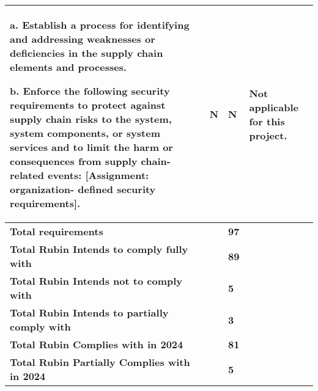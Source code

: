\begin{longtable} {|p{}|p{}|p{}|p{} |}
{a. Establish a process for identifying and addressing weaknesses or deficiencies in the supply chain elements and processes.

b. Enforce the following security requirements to protect against supply chain risks to the system, system components, or system services and to limit the harm or consequences from supply chain-related events: [Assignment: organization- defined security requirements].}&{N}&{N}&{Not applicable for this project.} \\ \hline
\textbf{Total requirements}&\textbf{}&\textbf{97}& \\ \hline
\textbf{Total Rubin Intends to comply fully with }&\textbf{}&\textbf{89}& \\ \hline
\textbf{Total Rubin Intends not to comply with }&\textbf{}&\textbf{5}& \\ \hline
\textbf{Total Rubin Intends to partially comply with }&\textbf{}&\textbf{3}& \\ \hline
\textbf{Total Rubin Complies with in 2024}&\textbf{}&\textbf{81}& \\ \hline
\textbf{Total Rubin Partially Complies with in 2024}&\textbf{}&\textbf{5}& \\ \hline
\end{longtable} \normalsize
